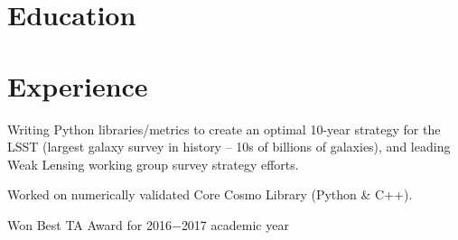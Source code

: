 \documentclass[]{deedy-resume-openfont}
\begin{document}
\begin{minipage}[t]{0.66\textwidth} 

\vfill\vfill
$\;$
\vfill


\section{\color{Blue} Education} 

 \hfill {}

\sectionsep

 \hfill {}
\sectionsep


\section{\color{Blue} Experience}

 \hfill {}

\begin{tightemize} \item Writing Python libraries/metrics to create an optimal 10-year strategy for the LSST (largest galaxy survey in history -- 10s of billions of galaxies), and leading Weak Lensing working group survey strategy efforts. \item Worked on numerically validated Core Cosmo Library (Python \& C++).
\end{tightemize}
\sectionsep

\begin{tightemize} \item Won Best TA Award for 2016$-$2017 academic year
\end{tightemize} 
\sectionsep

\sectionsep



\end{minipage}
\end{document}
